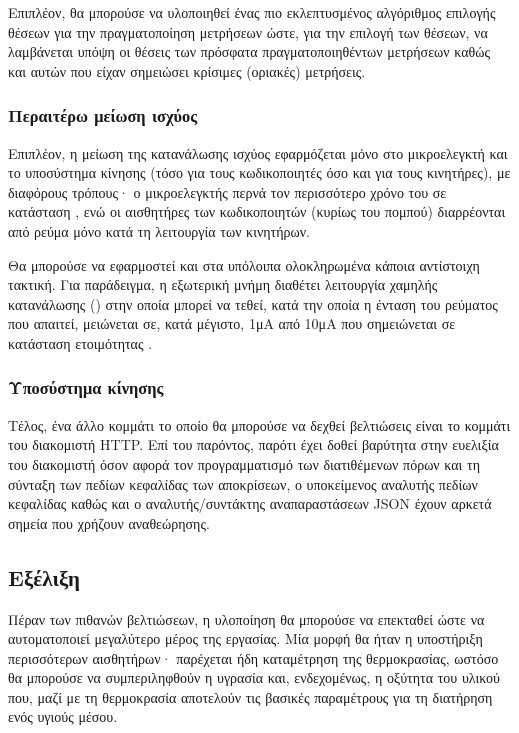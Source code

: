 Επιπλέον, θα μπορούσε να υλοποιηθεί ένας πιο εκλεπτυσμένος αλγόριθμος επιλογής
θέσεων για την πραγματοποίηση μετρήσεων ώστε, για την επιλογή των θέσεων, να
λαμβάνεται υπόψη οι θέσεις των πρόσφατα πραγματοποιηθέντων μετρήσεων καθώς
και αυτών που είχαν σημειώσει κρίσιμες (οριακές) μετρήσεις.


\subsubsection{Περαιτέρω μείωση ισχύος}

Επιπλέον, η μείωση της κατανάλωσης ισχύος εφαρμόζεται μόνο στο μικροελεγκτή και
το υποσύστημα κίνησης (τόσο για τους κωδικοποιητές όσο και για τους κινητήρες),
με διαφόρους τρόπους· ο μικροελεγκτής περνά τον περισσότερο χρόνο του σε
κατάσταση , ενώ οι αισθητήρες των κωδικοποιητών (κυρίως του
πομπού) διαρρέονται από ρεύμα μόνο κατά τη λειτουργία των κινητήρων.

Θα μπορούσε να εφαρμοστεί και στα υπόλοιπα ολοκληρωμένα κάποια αντίστοιχη
τακτική. Για παράδειγμα, η εξωτερική μνήμη  διαθέτει λειτουργία
χαμηλής κατανάλωσης () στην οποία μπορεί να τεθεί, κατά
την οποία η ένταση του ρεύματος που απαιτεί, μειώνεται σε, κατά μέγιστο, 1μA από
10μA που σημειώνεται σε κατάσταση ετοιμότητας \parencite[2,16]{25lc1024}.


\subsubsection{Υποσύστημα κίνησης}

Τέλος, ένα άλλο κομμάτι το οποίο θα μπορούσε να δεχθεί βελτιώσεις είναι το
κομμάτι του διακομιστή HTTP. Επί του παρόντος, παρότι έχει δοθεί βαρύτητα στην
ευελιξία του διακομιστή όσον αφορά τον προγραμματισμό των διατιθέμενων πόρων και
τη σύνταξη των πεδίων κεφαλίδας των αποκρίσεων, ο υποκείμενος αναλυτής πεδίων
κεφαλίδας καθώς και ο αναλυτής\slash{}συντάκτης αναπαραστάσεων JSON έχουν αρκετά
σημεία που χρήζουν αναθεώρησης.


\subsection{Εξέλιξη}

Πέραν των πιθανών βελτιώσεων, η υλοποίηση θα μπορούσε να επεκταθεί ώστε να
αυτοματοποιεί μεγαλύτερο μέρος της εργασίας. Μία μορφή θα ήταν η υποστήριξη
περισσότερων αισθητήρων· παρέχεται ήδη καταμέτρηση της θερμοκρασίας, ωστόσο θα
μπορούσε να συμπεριληφθούν η υγρασία και, ενδεχομένως, η οξύτητα του υλικού που,
μαζί με τη θερμοκρασία αποτελούν τις βασικές παραμέτρους για τη διατήρηση ενός
υγιούς μέσου.

